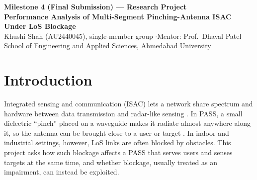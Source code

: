 \documentclass[11pt,a4paper]{article}
\begin{document}
\begin{center}
{\large\textbf{Milestone 4 (Final Submission) --- Research Project}}\\[4pt]
{\Large\textbf{Performance Analysis of Multi-Segment Pinching-Antenna ISAC Under LoS Blockage}}\\[6pt]
Khushi Shah (AU2440045), single-member group \quad$\cdot$\quad Mentor: Prof.\ Dhaval Patel\\
School of Engineering and Applied Sciences, Ahmedabad University
\end{center}

\begin{abstract}
\noindent Pinching-antenna systems (PASS) let the radiation point of an antenna move along a dielectric waveguide, which makes them attractive for integrated sensing and communication (ISAC): a shorter line-of-sight (LoS) link strengthens both the data signal and the radar echo. Blockage-aware PASS studies consider communication only, and blockage-aware ISAC studies consider conventional antennas only. This project analyzes a multi-segment PASS-ISAC system under environment-division multiple access (EDMA), where each waveguide segment activates one pinching antenna at the midpoint of its user and target, all segments operate concurrently, and LoS blockage of the cross-segment links jointly governs communication interference, sensing clutter, and sensing leakage. The project derives a closed-form mean cross-segment LoS probability, closed-form lower bounds on the ergodic sum communication rate (CR) and sensing rate (SR) for any number of segments, and a high-SNR design rule for when EDMA outperforms time-division multiple access (TDMA). These are verified against a Monte Carlo (MC) simulator and evaluated, under a physically grounded automated-guided-vehicle (AGV) target radar cross-section (RCS), against TDMA and a conventional uniform linear array (ULA). EDMA nearly triples the sum CR of TDMA and raises the sum SR up to sevenfold, while the ULA trails both; the design rule is validated, including the regime where it is only a necessary and not a sufficient condition. This report consolidates the full project across all four milestones: problem formulation, related work, methodology, implementation, experimental evaluation, critical analysis, final positioning relative to the state of the art (SOTA), limitations, and future work.
\end{abstract}

\section{Introduction}
Integrated sensing and communication (ISAC) lets a network share spectrum and hardware between data transmission and radar-like sensing \cite{9737357,11404239}. In PASS, a small dielectric ``pinch'' placed on a waveguide makes it radiate almost anywhere along it, so the antenna can be brought close to a user or target \cite{10945421,11364174,11434944}. In indoor and industrial settings, however, LoS links are often blocked by obstacles. This project asks how such blockage affects a PASS that serves users and senses targets at the same time, and whether blockage, usually treated as an impairment, can instead be exploited.
\end{document}
